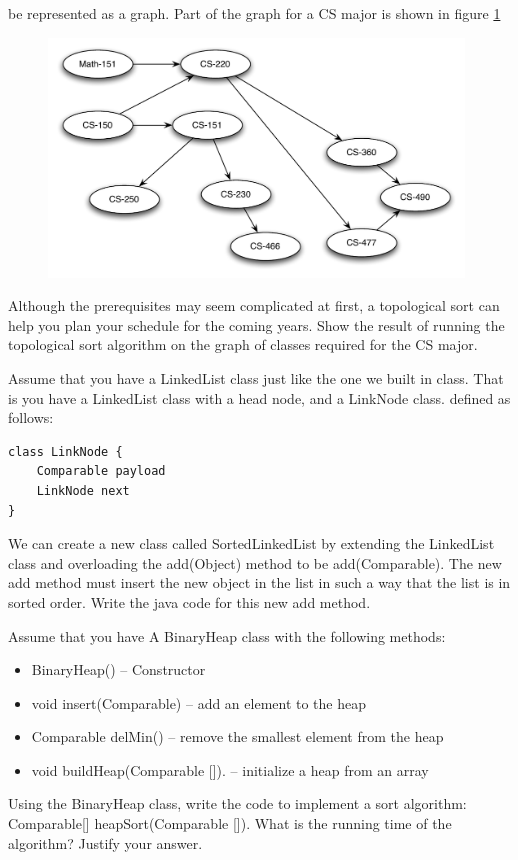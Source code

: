 \documentclass[11pt,letter]{exam}
\begin{document}
\begin{questions}
be represented as a graph.  Part of the graph for a CS major is shown in figure
\ref{fig:cs}
\begin{figure}[ht]
  \label{fig:cs}
  \centering
  \includegraphics[height=2.5in]{prereq-graph.pdf}
\end{figure}
Although the prerequisites may seem complicated at first, a topological sort can
help you plan your schedule for the coming years.  Show the result of running
the topological sort algorithm on the graph of classes required for the CS major.  

\newpage
\question[20]
Assume that you have a LinkedList class just like the one we built in class.
That is you have a LinkedList class with a head node, and a LinkNode class.
defined as follows: 
\begin{lstlisting}
class LinkNode {
    Comparable payload
    LinkNode next
}
\end{lstlisting}
We can create a new class called SortedLinkedList by extending the LinkedList 
class and overloading the add(Object) method to be add(Comparable).  The new add
method must insert the new object in the list in such a way that the list is in
sorted order.  Write the java code for this new add method.

\newpage
\question[20]
Assume that you have A BinaryHeap class with the following methods:
\begin{itemize}
\item BinaryHeap()  -- Constructor
\item void insert(Comparable)  -- add an element to the heap
\item Comparable delMin()  -- remove the smallest element from the heap
\item void buildHeap(Comparable []). -- initialize a heap from an array
\end{itemize}
Using the BinaryHeap class, write the code to implement a sort algorithm:
Comparable[] heapSort(Comparable []).  
What is the running time of the algorithm? Justify your answer.


\end{questions}
\end{document}
